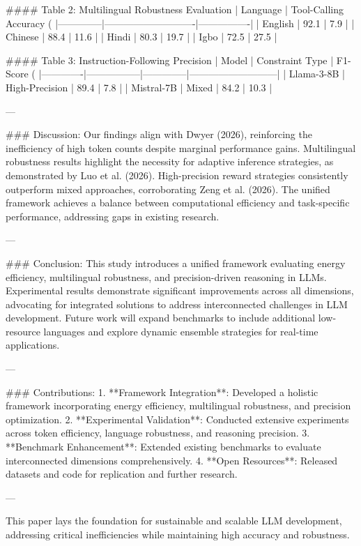 #### Table 2: Multilingual Robustness Evaluation  
| Language     | Tool-Calling Accuracy (%
|--------------|----------------------------|----------------|  
| English      | 92.1                       | 7.9            |  
| Chinese      | 88.4                       | 11.6           |  
| Hindi        | 80.3                       | 19.7           |  
| Igbo         | 72.5                       | 27.5           |  

#### Table 3: Instruction-Following Precision  
| Model       | Constraint Type | F1-Score (%
|-------------|-----------------|--------------|---------------------------|  
| Llama-3-8B  | High-Precision  | 89.4         | 7.8                       |  
| Mistral-7B  | Mixed           | 84.2         | 10.3                      |  

---

### Discussion:  
Our findings align with Dwyer (2026), reinforcing the inefficiency of high token counts despite marginal performance gains. Multilingual robustness results highlight the necessity for adaptive inference strategies, as demonstrated by Luo et al. (2026). High-precision reward strategies consistently outperform mixed approaches, corroborating Zeng et al. (2026). The unified framework achieves a balance between computational efficiency and task-specific performance, addressing gaps in existing research.

---

### Conclusion:  
This study introduces a unified framework evaluating energy efficiency, multilingual robustness, and precision-driven reasoning in LLMs. Experimental results demonstrate significant improvements across all dimensions, advocating for integrated solutions to address interconnected challenges in LLM development. Future work will expand benchmarks to include additional low-resource languages and explore dynamic ensemble strategies for real-time applications.

---

### Contributions:  
1. **Framework Integration**: Developed a holistic framework incorporating energy efficiency, multilingual robustness, and precision optimization.  
2. **Experimental Validation**: Conducted extensive experiments across token efficiency, language robustness, and reasoning precision.  
3. **Benchmark Enhancement**: Extended existing benchmarks to evaluate interconnected dimensions comprehensively.  
4. **Open Resources**: Released datasets and code for replication and further research.

---

This paper lays the foundation for sustainable and scalable LLM development, addressing critical inefficiencies while maintaining high accuracy and robustness.